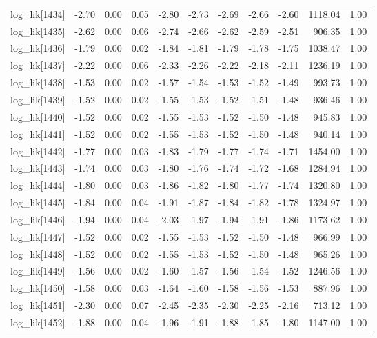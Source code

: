 \begin{table}[ht]
\begin{tabular}{rrrrrrrrrrr}
  log\_lik[1434] & -2.70 & 0.00 & 0.05 & -2.80 & -2.73 & -2.69 & -2.66 & -2.60 & 1118.04 & 1.00 \\ 
  log\_lik[1435] & -2.62 & 0.00 & 0.06 & -2.74 & -2.66 & -2.62 & -2.59 & -2.51 & 906.35 & 1.00 \\ 
  log\_lik[1436] & -1.79 & 0.00 & 0.02 & -1.84 & -1.81 & -1.79 & -1.78 & -1.75 & 1038.47 & 1.00 \\ 
  log\_lik[1437] & -2.22 & 0.00 & 0.06 & -2.33 & -2.26 & -2.22 & -2.18 & -2.11 & 1236.19 & 1.00 \\ 
  log\_lik[1438] & -1.53 & 0.00 & 0.02 & -1.57 & -1.54 & -1.53 & -1.52 & -1.49 & 993.73 & 1.00 \\ 
  log\_lik[1439] & -1.52 & 0.00 & 0.02 & -1.55 & -1.53 & -1.52 & -1.51 & -1.48 & 936.46 & 1.00 \\ 
  log\_lik[1440] & -1.52 & 0.00 & 0.02 & -1.55 & -1.53 & -1.52 & -1.50 & -1.48 & 945.83 & 1.00 \\ 
  log\_lik[1441] & -1.52 & 0.00 & 0.02 & -1.55 & -1.53 & -1.52 & -1.50 & -1.48 & 940.14 & 1.00 \\ 
  log\_lik[1442] & -1.77 & 0.00 & 0.03 & -1.83 & -1.79 & -1.77 & -1.74 & -1.71 & 1454.00 & 1.00 \\ 
  log\_lik[1443] & -1.74 & 0.00 & 0.03 & -1.80 & -1.76 & -1.74 & -1.72 & -1.68 & 1284.94 & 1.00 \\ 
  log\_lik[1444] & -1.80 & 0.00 & 0.03 & -1.86 & -1.82 & -1.80 & -1.77 & -1.74 & 1320.80 & 1.00 \\ 
  log\_lik[1445] & -1.84 & 0.00 & 0.04 & -1.91 & -1.87 & -1.84 & -1.82 & -1.78 & 1324.97 & 1.00 \\ 
  log\_lik[1446] & -1.94 & 0.00 & 0.04 & -2.03 & -1.97 & -1.94 & -1.91 & -1.86 & 1173.62 & 1.00 \\ 
  log\_lik[1447] & -1.52 & 0.00 & 0.02 & -1.55 & -1.53 & -1.52 & -1.50 & -1.48 & 966.99 & 1.00 \\ 
  log\_lik[1448] & -1.52 & 0.00 & 0.02 & -1.55 & -1.53 & -1.52 & -1.50 & -1.48 & 965.26 & 1.00 \\ 
  log\_lik[1449] & -1.56 & 0.00 & 0.02 & -1.60 & -1.57 & -1.56 & -1.54 & -1.52 & 1246.56 & 1.00 \\ 
  log\_lik[1450] & -1.58 & 0.00 & 0.03 & -1.64 & -1.60 & -1.58 & -1.56 & -1.53 & 887.96 & 1.00 \\ 
  log\_lik[1451] & -2.30 & 0.00 & 0.07 & -2.45 & -2.35 & -2.30 & -2.25 & -2.16 & 713.12 & 1.00 \\ 
  log\_lik[1452] & -1.88 & 0.00 & 0.04 & -1.96 & -1.91 & -1.88 & -1.85 & -1.80 & 1147.00 & 1.00 \\ 

\end{tabular}
\end{table}
